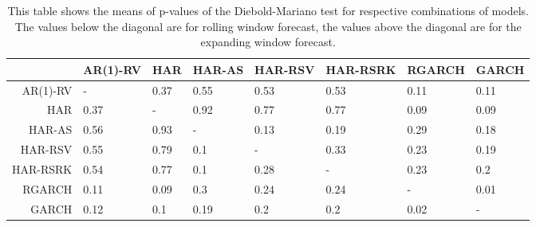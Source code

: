 \begin{table}[ht]
\centering
\begin{tabular}{rlllllll}
  \hline
 & AR(1)-RV & HAR & HAR-AS & HAR-RSV & HAR-RSRK & RGARCH & GARCH \\ 
  \hline
AR(1)-RV & - & 0.37 & 0.55 & 0.53 & 0.53 & 0.11 & 0.11 \\ 
  HAR & 0.37 & - & 0.92 & 0.77 & 0.77 & 0.09 & 0.09 \\ 
  HAR-AS & 0.56 & 0.93 & - & 0.13 & 0.19 & 0.29 & 0.18 \\ 
  HAR-RSV & 0.55 & 0.79 & 0.1 & - & 0.33 & 0.23 & 0.19 \\ 
  HAR-RSRK & 0.54 & 0.77 & 0.1 & 0.28 & - & 0.23 & 0.2 \\ 
  RGARCH & 0.11 & 0.09 & 0.3 & 0.24 & 0.24 & - & 0.01 \\ 
  GARCH & 0.12 & 0.1 & 0.19 & 0.2 & 0.2 & 0.02 & - \\ 
   \hline
\end{tabular}
\caption[DM test means]{This table shows the means of p-values of the Diebold-Mariano test for respective combinations of models.
                The values below the diagonal are for rolling window forecast, the values above the diagonal are for the expanding window forecast.} 
\label{Table:DM_test_mean}
\end{table}
